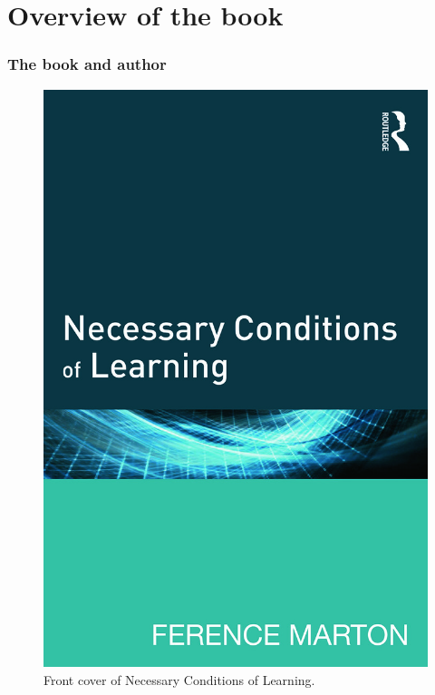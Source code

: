 \mode*

\part{Overview of the book}

\begin{frame}
  \tableofcontents
\end{frame}

\section[Book and author]{The book and author}

\begin{frame}
  \begin{figure}
    \includegraphics[height=0.8\textheight]{fig/book.jpg}
    \caption{Front cover of Necessary Conditions of Learning.}
  \end{figure}
\end{frame}

